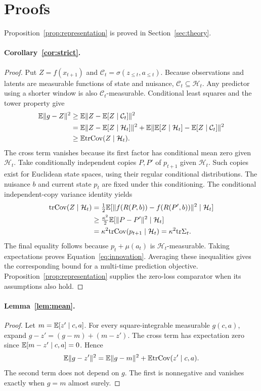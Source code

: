 \section{Proofs}
\label{app:proofs}

Proposition~\ref{prop:representation} is proved in Section~\ref{sec:theory}.

\paragraph{Corollary~\ref{cor:strict}.}
\begin{proof}
Put $Z=f(x_{t+1})$ and $\mathcal C_t=\sigma(z_{\le t},a_{\le t})$.
Because observations and latents are measurable functions of state and nuisance, $\mathcal C_t\subseteq\mathcal H_t$.
Any predictor using a shorter window is also $\mathcal C_t$-measurable.
Conditional least squares and the tower property give
\begin{align*}
\mathbb{E}\|g-Z\|^2
&\ge\mathbb{E}\|Z-\mathbb{E}[Z\mid\mathcal C_t]\|^2\\
&=\mathbb{E}\|Z-\mathbb{E}[Z\mid\mathcal H_t]\|^2
 +\mathbb{E}\|\mathbb{E}[Z\mid\mathcal H_t]-\mathbb{E}[Z\mid\mathcal C_t]\|^2\\
&\ge\mathbb{E}\mathrm{tr}\mathrm{Cov}(Z\mid\mathcal H_t).
\end{align*}
The cross term vanishes because its first factor has conditional mean zero given $\mathcal H_t$.
Take conditionally independent copies $P,P'$ of $p_{t+1}$ given $\mathcal H_t$.
Such copies exist for Euclidean state spaces, using their regular conditional distributions.
The nuisance $b$ and current state $p_t$ are fixed under this conditioning.
The conditional independent-copy variance identity yields
\begin{align*}
\mathrm{tr}\mathrm{Cov}(Z\mid\mathcal H_t)
&=\tfrac12\mathbb{E}[\|f(R(P,b))-f(R(P',b))\|^2\mid\mathcal H_t]\\
&\ge\tfrac{\kappa^2}{2}\mathbb{E}[\|P-P'\|^2\mid\mathcal H_t]\\
&=\kappa^2\mathrm{tr}\mathrm{Cov}(p_{t+1}\mid\mathcal H_t)
=\kappa^2\mathrm{tr}\Sigma_t.
\end{align*}
The final equality follows because $p_t+\mu(a_t)$ is $\mathcal H_t$-measurable.
Taking expectations proves Equation~\ref{eq:innovation}.
Averaging these inequalities gives the corresponding bound for a multi-time prediction objective.
Proposition~\ref{prop:representation} supplies the zero-loss comparator when its assumptions also hold.
\end{proof}

\paragraph{Lemma~\ref{lem:mean}.}
\begin{proof}
Let $m=\mathbb{E}[z'\mid c,a]$.
For every square-integrable measurable $g(c,a)$, expand $g-z'=(g-m)+(m-z')$.
The cross term has expectation zero since $\mathbb{E}[m-z'\mid c,a]=0$.
Hence
\[
\mathbb{E}\|g-z'\|^2=\mathbb{E}\|g-m\|^2+\mathbb{E}\mathrm{tr}\mathrm{Cov}(z'\mid c,a).
\]
The second term does not depend on $g$.
The first is nonnegative and vanishes exactly when $g=m$ almost surely.
\end{proof}

